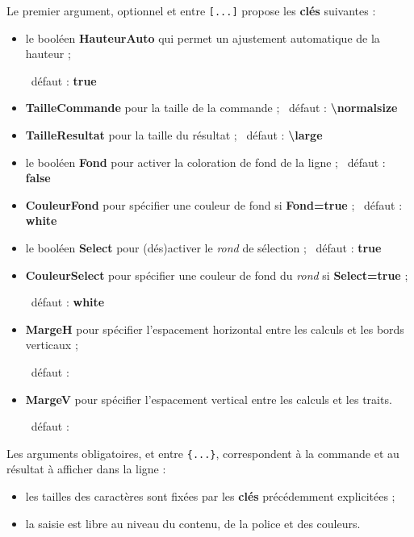 \documentclass[french,a4paper,11pt]{article}
\newcommand\Cle[1]{{\bfseries\sffamily\textlangle #1\textrangle}}
\begin{document}
\begin{tipblock}
Le premier argument, optionnel et entre \texttt{[...]} propose les \Cle{clés} suivantes :

\begin{itemize}
	\item le booléen \Cle{HauteurAuto} qui permet un ajustement automatique de la hauteur ;
	
	\hfill~défaut : \Cle{true}
	\item \Cle{TailleCommande} pour la taille de la commande ; \hfill~défaut : \Cle{\textbackslash normalsize}
	\item \Cle{TailleResultat} pour la taille du résultat ; \hfill~défaut : \Cle{\textbackslash large}
	\item le booléen \Cle{Fond} pour activer la coloration de fond de la ligne ; \hfill~défaut : \Cle{false}
	\item \Cle{CouleurFond} pour spécifier une couleur de fond si \Cle{Fond=true} ; \hfill~défaut : \Cle{white}
	\item le booléen \Cle{Select} pour (dés)activer le \textit{rond} de sélection ; \hfill~défaut : \Cle{true}
	\item \Cle{CouleurSelect} pour spécifier une couleur de fond du \textit{rond} si \Cle{Select=true} ;
	
	\hfill~défaut : \Cle{white}
	\item \Cle{MargeH} pour spécifier l'espacement horizontal entre les calculs et les bords verticaux ;
	
	\hfill~défaut : \Cle{0.2}
	\item \Cle{MargeV} pour spécifier l'espacement vertical entre les calculs et les traits.
	
	\hfill~défaut : \Cle{6pt}
\end{itemize}
\vspace*{-\baselineskip}\leavevmode
\end{tipblock}

\begin{tipblock}
Les arguments obligatoires, et entre \texttt{\{...\}}, correspondent à la commande et au résultat à afficher dans la ligne :

\begin{itemize}
	\item les tailles des caractères sont fixées par les \Cle{clés} précédemment explicitées ;
	\item la saisie est libre au niveau du contenu, de la police et des couleurs.
\end{itemize}
\vspace*{-\baselineskip}\leavevmode
\end{tipblock}
\end{document}
